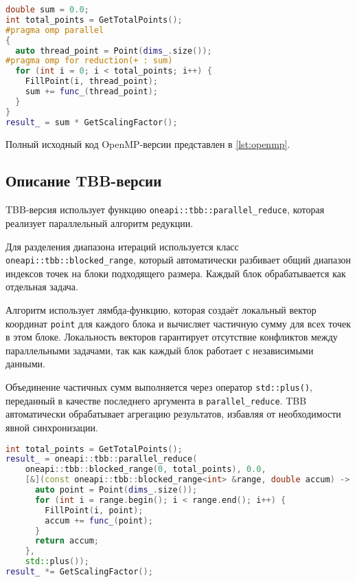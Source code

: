 \documentclass[a4paper,12pt]{article}
\begin{document}
  \begin{lstlisting}[language=C++, caption=Ключевой фрагмент OpenMP-версии,label={lst:openmp-fragment}]
double sum = 0.0;
int total_points = GetTotalPoints();
#pragma omp parallel
{
  auto thread_point = Point(dims_.size());
#pragma omp for reduction(+ : sum)
  for (int i = 0; i < total_points; i++) {
    FillPoint(i, thread_point);
    sum += func_(thread_point);
  }
}
result_ = sum * GetScalingFactor();
  \end{lstlisting}

  Полный исходный код OpenMP-версии представлен в \autoref{lst:openmp}.

  \subsection{Описание TBB-версии}\label{subsec:tbb_impl}

  TBB-версия использует функцию \texttt{oneapi::tbb::parallel\_reduce}, которая реализует параллельный алгоритм редукции.

  Для разделения диапазона итераций используется класс \texttt{oneapi::tbb::blocked\_range}, который автоматически разбивает общий диапазон индексов точек на блоки подходящего размера.
  Каждый блок обрабатывается как отдельная задача.

  Алгоритм использует лямбда-функцию, которая создаёт локальный вектор координат \texttt{point} для каждого блока и вычисляет частичную сумму для всех точек в этом блоке.
  Локальность векторов гарантирует отсутствие конфликтов между параллельными задачами, так как каждый блок работает с независимыми данными.

  Объединение частичных сумм выполняется через оператор \texttt{std::plus()}, переданный в качестве последнего аргумента в \texttt{parallel\_reduce}.
  TBB автоматически обрабатывает агрегацию результатов, избавляя от необходимости явной синхронизации.

  \begin{lstlisting}[language=C++, caption=Ключевой фрагмент TBB-версии,label={lst:tbb-fragment}]
int total_points = GetTotalPoints();
result_ = oneapi::tbb::parallel_reduce(
    oneapi::tbb::blocked_range(0, total_points), 0.0,
    [&](const oneapi::tbb::blocked_range<int> &range, double accum) -> double {
      auto point = Point(dims_.size());
      for (int i = range.begin(); i < range.end(); i++) {
        FillPoint(i, point);
        accum += func_(point);
      }
      return accum;
    },
    std::plus());
result_ *= GetScalingFactor();
  \end{lstlisting}
\end{document}
